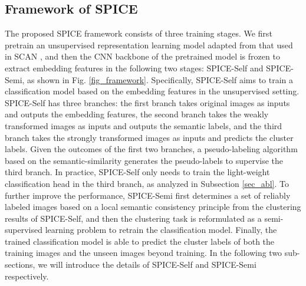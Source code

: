 \documentclass[10pt,twocolumn,letterpaper]{article}
\begin{document}
\subsection{Framework of SPICE}
The proposed SPICE framework consists of three training stages. We first pretrain an unsupervised representation learning model adapted from that used in SCAN \cite{scan}, and then the CNN backbone of the pretrained model is frozen to extract embedding features in the following two stages: SPICE-Self and SPICE-Semi, as shown in Fig. \ref{fig_framework}.
Specifically, SPICE-Self aims to train a classification model based on the embedding features in the unsupervised setting.
SPICE-Self has three branches: the first branch takes original images as inputs and outputs the embedding features, the second branch takes the weakly transformed images as inputs and outputs the semantic labels, and the third branch takes the strongly transformed images as inputs and predicts the cluster labels.
Given the outcomes of the first two branches, a pseudo-labeling algorithm based on the semantic-similarity generates the pseudo-labels to supervise the third branch.
In practice, SPICE-Self only needs to train the light-weight classification head in the third branch, as analyzed in Subsection \ref{sec_abl}.
To further improve the performance, SPICE-Semi first determines a set of reliably labeled images based on a local semantic consistency principle from the clustering results of SPICE-Self, and then the clustering task is reformulated as a semi-supervised learning problem to retrain the classification model.
Finally, the trained classification model is able to predict the cluster labels of both the training images and the unseen images beyond training. In the following two sub-sections, we will introduce the details of SPICE-Self and SPICE-Semi respectively.
\end{document}
